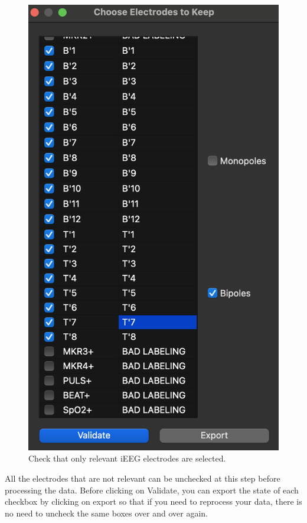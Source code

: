 \documentclass[a4paper]{article}
\begin{document}
\begin{figure}[H]
\begin{center}
\includegraphics[scale=0.6]{ConnectCleaner.png}
\end{center}
\caption{\label{ConnectCleanerMiscUI}Check that only relevant iEEG electrodes are selected.}
\end{figure}

All the electrodes that are not relevant can be unchecked at this step before processing the data. 
Before clicking on Validate, you can export the state of each checkbox by clicking on export so that if you need to reprocess your data, there is no need to uncheck the same boxes over and over again.
\end{document}
